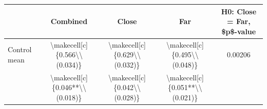 
\begin{longtable}[t]{lcccc}
\\
\toprule
 & Combined & Close & Far & H0: Close = Far, \$p\$-value\\
\midrule
Control mean & \textbackslash{}makecell[c]\{0.566\textbackslash{}\textbackslash{}(0.034)\} & \textbackslash{}makecell[c]\{0.629\textbackslash{}\textbackslash{}(0.032)\} & \textbackslash{}makecell[c]\{0.495\textbackslash{}\textbackslash{}(0.048)\} & 0.00206\\
 & \textbackslash{}makecell[c]\{0.046**\textbackslash{}\textbackslash{}(0.018)\} & \textbackslash{}makecell[c]\{0.042\textbackslash{}\textbackslash{}(0.028)\} & \textbackslash{}makecell[c]\{0.051**\textbackslash{}\textbackslash{}(0.021)\} & \\
\bottomrule
\end{longtable}
